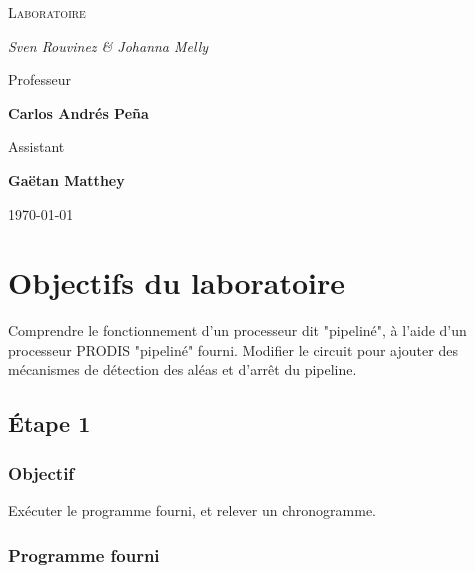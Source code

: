 \documentclass[a4paper]{article} %
\begin{document}
\renewcommand{\labelitemi}{$\bullet$}
\renewcommand{\labelitemii}{$\cdot$}
\renewcommand{\labelitemiii}{$\diamond$}
\renewcommand{\labelitemiv}{$\ast$}

\begin{titlepage}
	\centering
	
	{\scshape\LARGE \color{Monokaimagenta} Laboratoire \\  \par}
	
	\vspace{1cm}
	
	{\Large\itshape Sven Rouvinez \& Johanna Melly\par}
	
	\vfill
	Professeur\par
	\textbf{Carlos Andrés Peña} \par%
	\vspace{1cm}
	Assistant\par
	\textbf{Gaëtan Matthey}
	
	\vfill

	{\large \today\par}
	
\end{titlepage}

\section{Objectifs du laboratoire}
Comprendre le fonctionnement d'un processeur dit "pipeliné", à l'aide d'un processeur PRODIS "pipeliné" fourni. Modifier le circuit pour ajouter des mécanismes de détection des aléas et d'arrêt du pipeline.
\subsection{Étape 1}
\subsubsection{Objectif}
Exécuter le programme fourni, et relever un chronogramme.
\subsubsection{Programme fourni}

\end{document}

